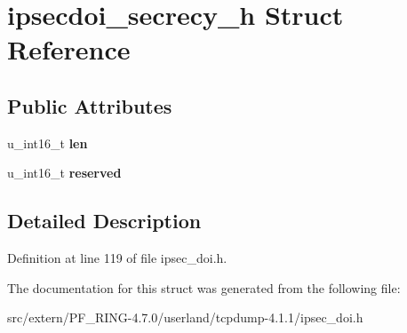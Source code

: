 \hypertarget{structipsecdoi__secrecy__h}{
\section{ipsecdoi\_\-secrecy\_\-h Struct Reference}
\label{structipsecdoi__secrecy__h}
}
\subsection*{Public Attributes}
\begin{DoxyCompactItemize}
\item 
\hypertarget{structipsecdoi__secrecy__h_ad66e13c9158c2f9184bfab8a8fa452ba}{
u\_\-int16\_\-t {\bfseries len}}
\label{structipsecdoi__secrecy__h_ad66e13c9158c2f9184bfab8a8fa452ba}

\item 
\hypertarget{structipsecdoi__secrecy__h_ab8a911ad8024449497ec458cd2e382b1}{
u\_\-int16\_\-t {\bfseries reserved}}
\label{structipsecdoi__secrecy__h_ab8a911ad8024449497ec458cd2e382b1}

\end{DoxyCompactItemize}


\subsection{Detailed Description}


Definition at line 119 of file ipsec\_\-doi.h.



The documentation for this struct was generated from the following file:\begin{DoxyCompactItemize}
\item 
src/extern/PF\_\-RING-\/4.7.0/userland/tcpdump-\/4.1.1/ipsec\_\-doi.h\end{DoxyCompactItemize}
